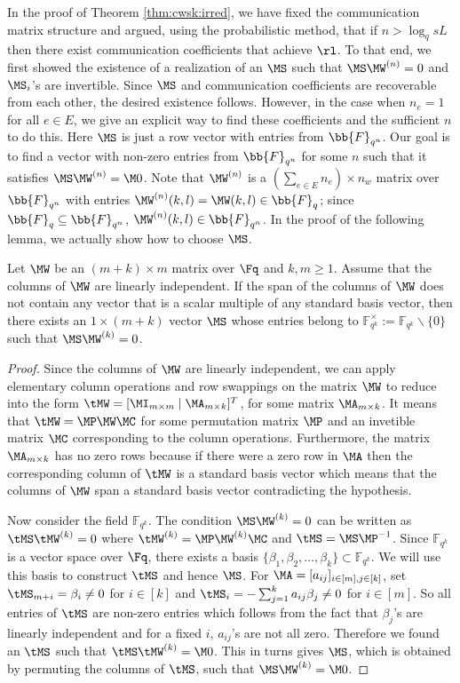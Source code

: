 In the proof of Theorem \ref{thm:cwsk:irred}, we have fixed the communication matrix structure and argued, using the probabilistic method, that if $n > \log_q sL$ then there exist communication coefficients  that achieve $\rl$. To that end, we first showed the existence of a realization of an $\MS$ such that $\MS\MW^{(n)}=0$ and $\MS_i$'s are invertible. Since $\MS$ and communication coefficients are recoverable from each other, the desired existence follows. However, in the case when $n_e=1$ for all $e \in E$, we give an explicit way to find these coefficients and the sufficient $n$ to do this. Here $\MS$ is just a row vector with entries from $\bb{F}_{q^n}$. Our goal is to find a vector with non-zero entries from $\bb{F}_{q^n}$  for some $n$ such that it satisfies $\MS\MW^{(n)} =\M0$.  Note that $\MW^{(n)}$ is a $\left(\sum_{e \in E} n_e\right) \times n_w$ matrix over $\bb{F}_{q^n}$ with entries $\MW^{(n)}(k,l) = \MW(k,l) \in  \bb{F}_{q}$; since $\bb{F}_{q} \subseteq \bb{F}_{q^n}$, $\MW^{(n)}(k,l) \in \bb{F}_{q^n}$. In the proof of the  following lemma, we actually show how to choose $\MS$.
 \begin{lemma}
  Let $\MW$ be an $(m+k) \times m$ matrix over $\Fq$ and $k,m \geq 1$. Assume that the columns of $\MW$ are linearly independent. If the span of the columns of $\MW$ does not contain any vector that is a scalar multiple of any standard basis vector, then there exists an $1 \times  (m+k)$ vector $\MS$ whose entries belong to $\mathbb{F}_{q^k}^{\times} := \mathbb{F}_{q^k} \backslash \{0\}$ such that $\MS\MW^{(k)}=0$.
 \end{lemma}
 \begin{proof}
  Since the columns of $\MW$ are linearly independent, we can apply elementary column operations and row swappings on the matrix $\MW$ to reduce into the form $\tMW=[\MI_{m\times m} \mid \MA_{m \times k}]^T$, for some matrix $\MA_{m \times k}$. It means that $\tMW=\MP\MW\MC$ for some permutation matrix $\MP$ and an invetible matrix $\MC$ corresponding to the column operations. Furthermore, the matrix $\MA_{m \times k}$ has no zero rows because if there were a zero row in $\MA$ then the corresponding column of $\tMW$ is a standard basis vector which means that the columns of $\MW$ span a standard basis vector contradicting the hypothesis.
  
  Now consider the field $\mathbb{F}_{q^k}$. The condition $\MS\MW^{(k)} =0$ can be written as  $\tMS\tMW^{(k)} = 0$ where $\tMW^{(k)}=\MP\MW^{(k)}\MC$ and $\tMS=\MS\MP^{-1}$. Since $\mathbb{F}_{q^k}$ is a vector space over $\Fq$, there exists a basis  $\{\beta_1, \beta_2, \ldots, \beta_k\} \subset \mathbb{F}_{q^k}$. We will use this basis to construct $\tMS$ and hence $\MS$. For $\MA=[a_{ij}]_{i \in [m], j \in [k]}$, set $\tMS_{m+i} = \beta_i\neq 0$ for $i \in [k]$ and $\tMS_i = - \sum_{j=1} ^{k} a_{ij}\beta_j \neq 0$ for $i \in [m]$. So all entries of $\tMS$  are non-zero entries which follows from the fact that $\beta_j$'s are linearly independent and for a fixed $i$, $a_{ij}$'s are not all zero. Therefore we found an $\tMS$ such that $\tMS\tMW^{(k)} = \M0$. This in turns gives $\MS$, which is obtained by permuting the columns of $\tMS$, such that $\MS\MW^{(k)} = \M0$.
 \end{proof}
 
